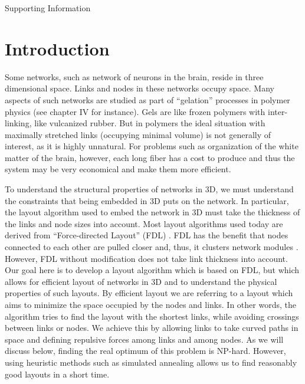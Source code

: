 \documentclass[nofootinbib,preprint,floatfix,titlepage,superscriptaddress]{revtex4} %
\newcommand{\finV}[2]{#2}
\begin{document}
\renewcommand{\thesection}{SI \arabic{section}}
\setcounter{page}{1}
\setcounter{figure}{0}
\centerline{\Huge Supporting Information}

\finV{
\renewcommand{\citep}[1]{}
}{
\maketitle
}


\tableofcontents


\section{Introduction}
Some networks, such as network of neurons in the brain, reside in three dimensional space. 
Links and nodes in these networks occupy space. 
Many aspects of such networks are studied  as part of ``gelation'' processes in polymer physics (see \citep{de1979scaling} chapter IV for instance). 
Gels are like frozen polymers with inter-linking, like vulcanized rubber. But in polymers the ideal situation with maximally stretched links (occupying minimal volume) is not generally of interest, as it is highly unnatural. 
For problems such as organization of the white matter of the brain, however, each long fiber has a cost to produce and thus the system may be very economical and make them more efficient.

To understand the structural properties of networks in 3D, we must understand the constraints that being embedded in 3D puts on the network. 
In particular, the layout algorithm used to embed the network in 3D must take the thickness of the links and node sizes into account. 
Most layout algorithms used today are derived from ``Force-directed Layout'' (FDL) \citep{davidson1996drawing,kamada1989algorithm}. 
FDL has the benefit that nodes connected to each other are pulled closer and, thus, it clusters network modules \citep{noack2009modularity}. 
However, FDL without modification does not take link thickness into account. 
Our goal here is to develop a layout algorithm which is based on FDL, but which allows for efficient layout of networks in 3D and to understand the physical properties of such layouts.
By efficient layout we are referring to a layout which aims to minimize the space occupied by the nodes and links. 
In other words, the algorithm tries to find the layout with the shortest links, while avoiding crossings between links or nodes.
We achieve this by allowing links to take curved paths in space and defining repulsive forces among links and among nodes. 
As we will discuss below, finding the real optimum of this problem is NP-hard. 
However, using heuristic methods such as simulated annealing allows us to find reasonably good layouts in a short time.  
\end{document}
